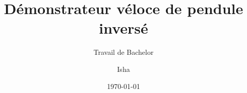 \author{Isha }

\setmale

\title{Démonstrateur véloce de pendule inversé}

\subtitle{Travail de Bachelor}


\date{\today}

